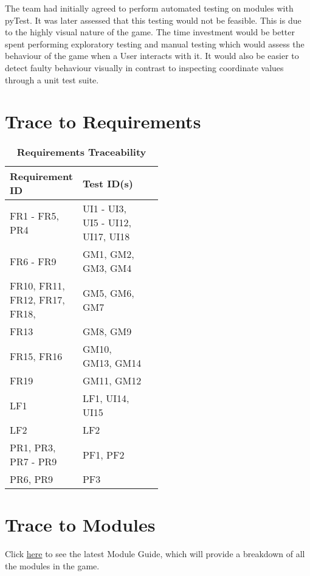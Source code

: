 \documentclass[12pt, titlepage]{article}
\begin{document}
The team had initially agreed to perform automated testing on modules with pyTest. It was later assessed that this testing would not be feasible. This is due to the highly visual nature of the game. The time investment would be better spent performing exploratory testing and manual testing which would assess the behaviour of the game when a User interacts with it. It would also be easier to detect faulty behaviour visually in contrast to inspecting coordinate values through a unit test suite.

\section{Trace to Requirements}
\begin{table}[H]
\caption{\bf Requirements Traceability}
\begin{tabular}{|l|p{0.5\linewidth}|l|}
\hline
\multicolumn{1}{|l}{\bfseries Requirement ID}  & \multicolumn{1}{l|}{\bfseries Test ID(s)}\\
\hline
FR1 - FR5, PR4 &  UI1 - UI3, UI5 - UI12, UI17, UI18 \\
\hline
FR6 - FR9 &  GM1, GM2, GM3, GM4 \\
\hline
FR10, FR11, FR12, FR17, FR18, &  GM5, GM6, GM7\\
\hline
FR13 & GM8, GM9\\
\hline
FR15, FR16 &  GM10, GM13, GM14\\
\hline
FR19 &  GM11, GM12\\
\hline
LF1 &  LF1, UI14, UI15\\
\hline
LF2 &  LF2\\
\hline
PR1, PR3, PR7 - PR9 &  PF1, PF2\\
\hline
PR6, PR9 &  PF3\\
\hline
\end{tabular}
\end{table}

\newpage

\section{Trace to Modules}		
Click \href{https://gitlab.cas.mcmaster.ca/jandricd/super-refactored-mario-bros/-/blob/master/Doc/Design/MG/MG.pdf}{here} to see the latest Module Guide, which will provide a breakdown of all the modules in the game.
\end{document}
